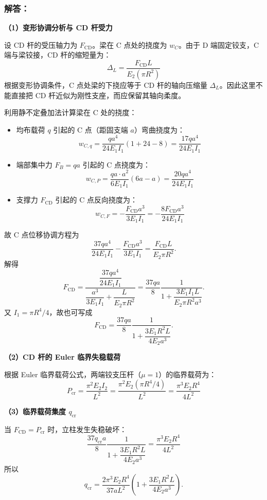 \documentclass[11pt,a4paper]{ctexrep}
\begin{document}
{\subsubsection*{解答：}

\textbf{（1）变形协调分析与 CD 杆受力}

设 CD 杆的受压轴力为 $F_{\text{CD}}$。梁在 C 点处的挠度为 $w_C$。由于 D 端固定铰支，C 端与梁铰接，CD 杆的缩短量为：
\[
    \Delta_L = \frac{F_{\text{CD}} L}{E_2 (\pi R^2)}
\]
根据变形协调条件，C 点处梁的下挠应等于 CD 杆的轴向压缩量 $\Delta_L$。因此这里不能直接把 CD 杆近似为刚性支座，而应保留其轴向柔度。

利用静不定叠加法计算梁在 C 处的挠度：
\begin{itemize}
    \item 均布载荷 $q$ 引起的 C 点（距固支端 $a$）弯曲挠度为：
    \[
        w_{C, q} = \frac{q a^4}{24 E_1 I_1} \left( 1 + 24 - 8 \right) = \frac{17 q a^4}{24 E_1 I_1}
    \]
    \item 端部集中力 $F_B = qa$ 引起的 C 点挠度为：
    \[
        w_{C, P} = \frac{qa \cdot a^2}{6 E_1 I_1}(6a - a) = \frac{20 q a^4}{24 E_1 I_1}
    \]
    \item 支撑力 $F_{\text{CD}}$ 引起的 C 点反向挠度为：
    \[
        w_{C, F} = -\frac{F_{\text{CD}} a^3}{3 E_1 I_1} = -\frac{8 F_{\text{CD}} a^3}{24 E_1 I_1}
    \]
\end{itemize}
故 C 点位移协调方程为
\[
    \frac{37qa^4}{24E_1I_1}
    -
    \frac{F_{\text{CD}}a^3}{3E_1I_1}
    =
    \frac{F_{\text{CD}}L}{E_2\pi R^2}.
\]
解得
\[
    F_{\text{CD}}
    =
    \frac{\dfrac{37qa^4}{24E_1I_1}}
    {\dfrac{a^3}{3E_1I_1}+\dfrac{L}{E_2\pi R^2}}
    =
    \frac{37qa}{8}
    \frac{1}
    {1+\dfrac{3E_1I_1L}{E_2\pi R^2a^3}}.
\]
又 $I_1=\pi R^4/4$，故也可写成
\[
    F_{\text{CD}}
    =
    \frac{37qa}{8}
    \frac{1}
    {1+\dfrac{3E_1R^2L}{4E_2a^3}}.
\]

\textbf{（2）CD 杆的 Euler 临界失稳载荷}

根据 Euler 临界载荷公式，两端铰支压杆（$\mu=1$）的临界载荷为：
\[
    P_{\text{cr}} = \frac{\pi^2 E_2 I_2}{L^2} = \frac{\pi^2 E_2 (\pi R^4 / 4)}{L^2} = \frac{\pi^3 E_2 R^4}{4 L^2}
\]

\textbf{（3）临界载荷集度 $q_{\text{cr}}$}

当 $F_{\text{CD}} = P_{\text{cr}}$ 时，立柱发生失稳破坏：
\[
    \frac{37q_{\text{cr}}a}{8}
    \frac{1}
    {1+\dfrac{3E_1R^2L}{4E_2a^3}}
    =
    \frac{\pi^3 E_2 R^4}{4 L^2}
\]
所以
\[
    q_{\text{cr}}
    =
    \frac{2 \pi^3 E_2 R^4}{37 a L^2}
    \left(
    1+\frac{3E_1R^2L}{4E_2a^3}
    \right).
\]


}
\end{document}
